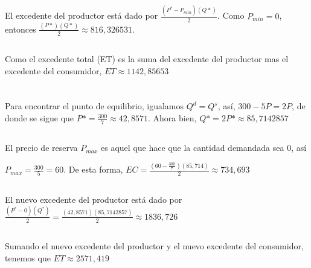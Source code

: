 \documentclass[11pt,a4paper]{article} %
\begin{document}
\subsection{}

\noindent El excedente del productor está dado por $\frac{(P^{*}-P_{min})(Q*)}{2}$. Como $P_{min} = 0$, entonces $\frac{(P*)(Q*)}{2} \approx 816,326531$. 

\subsection{}

\noindent Como el excedente total (ET) es la suma del excedente del productor mas el excedente del consumidor, $ET \approx 1142,85653$

\section{}

\subsection{}

\noindent Para encontrar el punto de equilibrio, igualamos $Q^d = Q^s$, así, $300-5P=2P$, de donde se sigue que $P* = \frac{300}{7} \approx 42,8571$. Ahora bien, $Q* = 2P* \approx 85,7142857$

\subsection{}

\noindent El precio de reserva $P_{max}$ es aquel que hace que la cantidad demandada sea 0, así

$P_{max} = \frac{300}{5} = 60$. De esta forma, $EC = \frac{(60-\frac{300}{7})(85,714)}{2} \approx 734,693$ 


\subsection{}

\noindent El nuevo excedente del productor está dado por $\frac{(P^{*}-0)(Q^{*})}{2} = \frac{(42,8571)(85,7142857)}{2} \approx 1836,726$

\subsection{}

\noindent Sumando el nuevo excedente del productor y el nuevo excedente del consumidor, tenemos que $ET \approx 2571,419$ 



%

\end{document}
